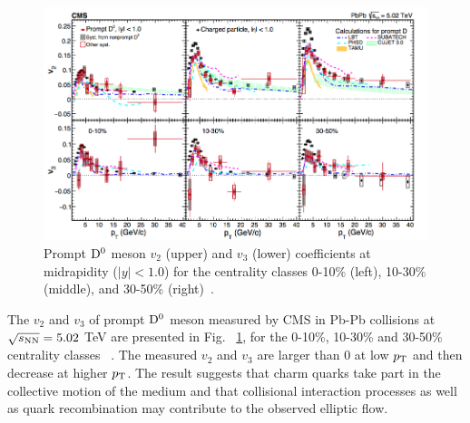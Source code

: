 \begin{figure}[!ht]
  \centering
        \includegraphics[width=14cm]{FigCap2/D0v2_CMS_5TeV.png}
  \caption{Prompt ${\rm D^0}$ meson $v_2$ (upper) and $v_3$ (lower) coefficients at midrapidity ($|y| < 1.0$) for
the centrality classes 0-10\% (left), 10-30\% (middle), and 30-50\% (right)~\cite{Sirunyan:2017plt}.}
  \label{fig:D0v2CMS}
\end{figure}

The $v_2$ and $v_3$ of prompt ${\rm D^0}$ meson measured by CMS 
in Pb-Pb collisions at $\sqrt{s_{\rm NN}} = 5.02 $ TeV are presented in 
Fig.~	\ref{fig:D0v2CMS}, for the 0-10\%, 
10-30\% and 30-50\% centrality classes ~\cite{Sirunyan:2017plt}. 
The measured $v_2$ and $v_3$ are larger than 0 
at low $p_{\rm T}$ and then decrease at higher $p_{\rm T}$.
The result suggests that charm quarks take part in 
the collective motion of the medium and that collisional interaction processes as well as quark 
recombination may contribute to the observed elliptic flow. \\




